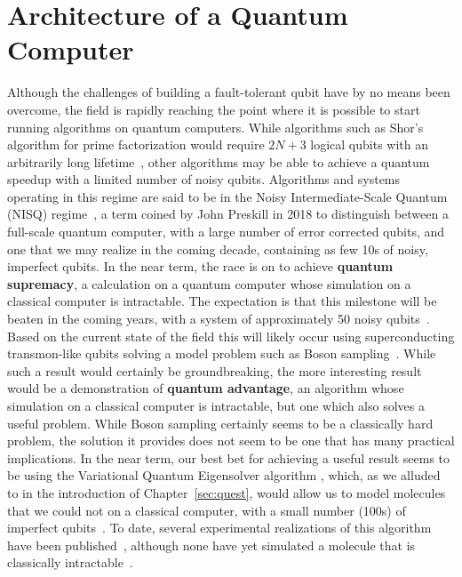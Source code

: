 \chapter{Architecture of a Quantum Computer}
\label{sec:arch}
Although the challenges of building a fault-tolerant qubit have by no means been overcome, the field is rapidly reaching the point where
it is possible to start running algorithms on quantum computers. While algorithms such as Shor's algorithm for prime factorization
would require $2N + 3$ logical qubits with an arbitrarily long lifetime~\cite{Beauregard:2003,6657074}, other algorithms may
be able to achieve a quantum speedup with a limited number of noisy qubits. Algorithms and systems operating in this regime are
said to be in the Noisy Intermediate-Scale Quantum (NISQ) regime~\cite{Preskill2018quantumcomputingin}, a term coined by John Preskill
in 2018 to distinguish between a full-scale quantum computer, with a large number of error corrected qubits, and one that we may realize
in the coming decade, containing as few 10s of noisy, imperfect qubits. In the near term, the race is on to achieve \textbf{quantum supremacy},
a calculation on a quantum computer whose simulation on a classical computer is intractable. The expectation is that this milestone will
be beaten in the coming years, with a system of approximately 50 noisy qubits~\cite{s41567-018-0124-x}. Based on the current state of the field
this will likely occur using superconducting transmon-like qubits solving a model problem such as Boson sampling~\cite{Aaronson:2011}. While such a
result would certainly be groundbreaking, the more interesting result would be a demonstration of \textbf{quantum advantage}, an algorithm whose simulation on a
classical computer is intractable, but one which also solves a useful problem. While Boson sampling certainly seems to be a classically hard problem,
the solution it provides does not seem to be one that has many practical implications. In the near term, our best bet for achieving a useful result
seems to be using the Variational Quantum Eigensolver algorithm \cite{ncomms5213}, which, as we alluded to in the introduction of Chapter~\ref{sec:quest}, would allow us
to model molecules that we could not on a classical computer, with a small number (100s) of imperfect qubits~\cite{PhysRevA.92.042303}.
To date, several experimental realizations of this algorithm have been published~\cite{nature23879,PhysRevX.8.011021,10.1038/s41586-019-1040-7},
although none have yet simulated a molecule that is classically intractable~\cite{Reiher7555}.

